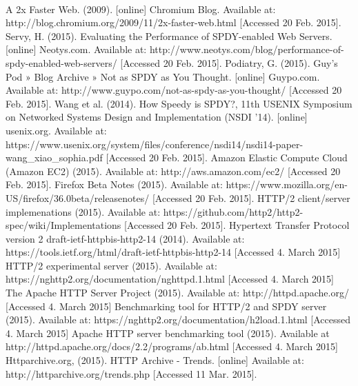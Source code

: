 \documentclass{article}
\begin{document}
\begin{thebibliography}
\\
A 2x Faster Web. (2009). [online] Chromium Blog. Available at: http://blog.chromium.org/2009/11/2x-faster-web.html [Accessed 20 Feb. 2015].
Servy, H. (2015). Evaluating the Performance of SPDY-enabled Web Servers. [online] Neotys.com. Available at: http://www.neotys.com/blog/performance-of-spdy-enabled-web-servers/ [Accessed 20 Feb. 2015].
Podiatry, G. (2015). Guy's Pod » Blog Archive » Not as SPDY as You Thought. [online] Guypo.com. Available at: http://www.guypo.com/not-as-spdy-as-you-thought/ [Accessed 20 Feb. 2015].
Wang et al. (2014). How Speedy is SPDY?, 11th USENIX Symposium on Networked Systems Design and Implementation (NSDI ’14). [online] usenix.org. Available at:
https://www.usenix.org/system/files/conference/nsdi14/nsdi14-paper-wang\_xiao\_sophia.pdf [Accessed 20 Feb. 2015].
 Amazon Elastic Compute Cloud (Amazon EC2) (2015). Available at: http://aws.amazon.com/ec2/ [Accessed 20 Feb. 2015].
 Firefox Beta Notes (2015). Available at: https://www.mozilla.org/en-US/firefox/36.0beta/releasenotes/ [Accessed 20 Feb. 2015].
  HTTP/2 client/server implemenations (2015). Available at: https://github.com/http2/http2-spec/wiki/Implementations [Accessed 20 Feb. 2015].
 Hypertext Transfer Protocol version 2 draft-ietf-httpbis-http2-14 (2014). Available at: https://tools.ietf.org/html/draft-ietf-httpbis-http2-14 [Accessed 4. March 2015]
 HTTP/2 experimental server (2015). Available at: https://nghttp2.org/documentation/nghttpd.1.html [Accessed 4. March 2015]
 The Apache HTTP Server Project (2015). Available at: http://httpd.apache.org/ [Accessed 4. March 2015]
 Benchmarking tool for HTTP/2 and SPDY server (2015). Available at: https://nghttp2.org/documentation/h2load.1.html [Accessed 4. March 2015]
 Apache HTTP server benchmarking tool (2015). Available at http://httpd.apache.org/docs/2.2/programs/ab.html [Accessed 4. March 2015]
 Httparchive.org, (2015). HTTP Archive - Trends. [online] Available at: http://httparchive.org/trends.php [Accessed 11 Mar. 2015].
\end{thebibliography}

\newpage
\appendix
\end{document}
